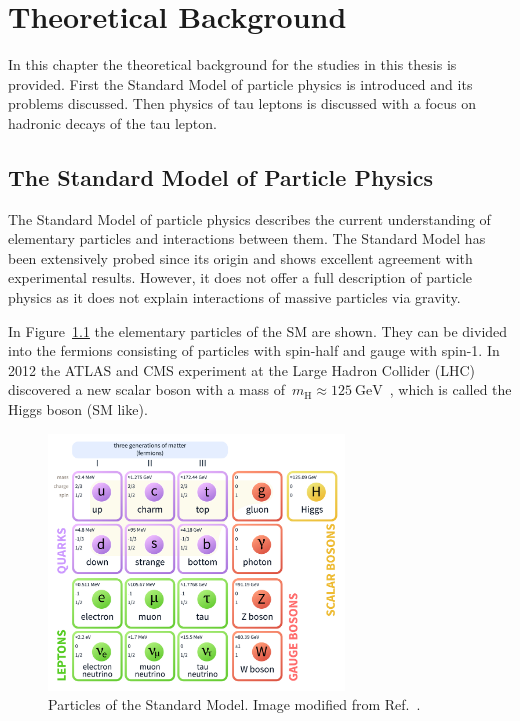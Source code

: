 \chapter{Theoretical Background}
\label{sec:theory}

In this chapter the theoretical background for the studies in this thesis is
provided. First the Standard Model of particle physics is introduced and its
problems discussed. Then physics of tau leptons is discussed with a focus on
hadronic decays of the tau lepton.

\section{The Standard Model of Particle Physics}

The Standard Model of particle physics describes the current understanding of
elementary particles and interactions between them. The Standard Model has been
extensively probed since its origin and shows excellent agreement with
experimental results. However, it does not offer a full description of particle
physics as it does not explain interactions of massive particles via gravity.

In Figure~\ref{fig:sm_particles} the elementary particles of the SM are shown.
They can be divided into the fermions consisting of particles with spin-half and
gauge with spin-1. In 2012 the ATLAS and CMS experiment at the Large Hadron
Collider (LHC) discovered a new scalar boson with a mass
of~$m_\text{H} \approx \SI{125}{\GeV}$~\cite{higgs_atlas, higgs_cms}, which is
called the Higgs boson (SM like).

\begin{figure}[htb]
  \centering
  \includegraphics[width=0.7\textwidth]{./figures/theory/sm_particles.pdf}
  \caption{Particles of the Standard Model. Image modified from
    Ref.~\cite{sm_wiki}.}
  \label{fig:sm_particles}
\end{figure}

